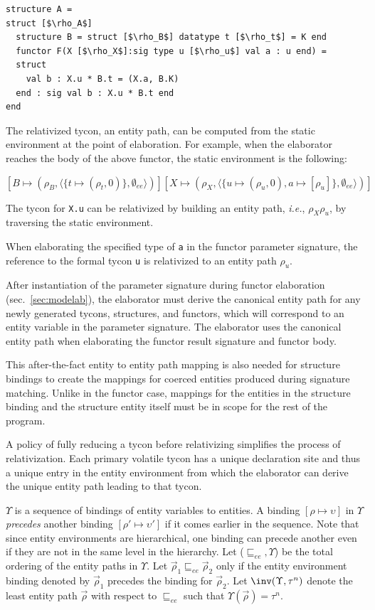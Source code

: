 \documentclass[9pt,nocopyrightspace, fleqn]{sigplanconf}
\begin{document}
\begin{lstlisting}
structure A =
struct [$\rho_A$]
  structure B = struct [$\rho_B$] datatype t [$\rho_t$] = K end
  functor F(X [$\rho_X$]:sig type u [$\rho_u$] val a : u end) =
  struct 
    val b : X.u * B.t = (X.a, B.K)
  end : sig val b : X.u * B.t end
end
\end{lstlisting}

The relativized tycon, an entity path, can be computed from the static environment at the point of elaboration. For example, when the elaborator reaches the body of the above functor, the static environment is the following:

$[B\mapsto (\rho_B, \langle \{t \mapsto (\rho_t, 0)\}, \emptyset_{ee}\rangle)][X\mapsto (\rho_X,\langle\{u\mapsto(\rho_u,0), a\mapsto [\rho_u]\},\emptyset_{ee}\rangle)]$

The tycon for \lstinline{X.u} can be relativized by building an entity path, \emph{i.e.}, $\rho_X\rho_u$, by traversing the static environment. 

When elaborating the specified type of \lstinline{a} in the functor parameter signature, the reference to the formal tycon \lstinline{u} is relativized to an entity path $\rho_u$. 

After instantiation of the parameter signature during functor elaboration (sec.~\ref{sec:modelab}),  the elaborator must derive the canonical entity path for any newly generated tycons, structures, and functors, which will correspond to an entity variable in the parameter signature. The elaborator uses the canonical entity path when elaborating the functor result signature and functor body. 

This after-the-fact entity to entity path mapping is also needed for structure bindings to create the mappings for coerced entities produced during signature matching. Unlike in the functor case, mappings for the entities in the structure binding and the structure entity itself must be in scope for the rest of the program. 

A policy of fully reducing a tycon before relativizing 
simplifies the process of relativization. Each primary
volatile tycon has a unique declaration site and thus a unique entry in the
entity environment from which the elaborator can derive the unique
entity path leading to that tycon. 

$\Upsilon$ is a sequence of bindings of entity variables to
entities. A binding $[\rho\mapsto\upsilon]$ in $\Upsilon$
\emph{precedes} another binding $[\rho'\mapsto\upsilon']$ if it comes
earlier in the sequence. Note that since entity environments are
hierarchical, one binding can precede another even if they are not in
the same level in the hierarchy.  Let ($\sqsubseteq_{ee}, \Upsilon$) be the total ordering of
the entity paths in $\Upsilon$. Let $\vec{\rho}_1 \sqsubseteq_{ee}
\vec{\rho}_2$ only if the entity environment binding denoted by
$\vec{\rho}_1$ precedes the binding for $\vec{\rho}_2$. Let
$\inv(\Upsilon, \tau^n)$ denote the least entity path $\vec{\rho}$ with respect to
$\sqsubseteq_{ee}$ such that $\Upsilon(\vec{\rho}) = \tau^n$. 
\end{document}
